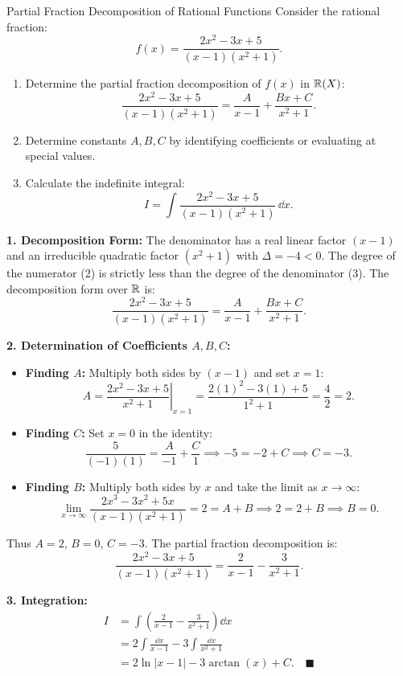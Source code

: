 \begin{exercise}{Partial Fraction Decomposition of Rational Functions}
Consider the rational fraction:
\[
f(x) = \frac{2x^2 - 3x + 5}{(x - 1)(x^2 + 1)}.
\]
\begin{enumerate}[leftmargin=1.5em,itemsep=2pt]
  \item Determine the partial fraction decomposition of $f(x)$ in $\mathbb{R}(X)$:
  \[
  \frac{2x^2 - 3x + 5}{(x - 1)(x^2 + 1)} = \frac{A}{x - 1} + \frac{Bx + C}{x^2 + 1}.
  \]
  \item Determine constants $A, B, C$ by identifying coefficients or evaluating at special values.
  \item Calculate the indefinite integral:
  \[
  I = \int \frac{2x^2 - 3x + 5}{(x - 1)(x^2 + 1)}\,\dd x.
  \]
\end{enumerate}
\end{exercise}

\begin{tabletworkspace}[5.0cm]
\end{tabletworkspace}

\begin{solution}
\textbf{1. Decomposition Form:}
The denominator has a real linear factor $(x - 1)$ and an irreducible quadratic factor $(x^2 + 1)$ with $\Delta = -4 < 0$. The degree of the numerator (2) is strictly less than the degree of the denominator (3).
The decomposition form over $\mathbb{R}$ is:
\[
\frac{2x^2 - 3x + 5}{(x - 1)(x^2 + 1)} = \frac{A}{x - 1} + \frac{Bx + C}{x^2 + 1}.
\]

\textbf{2. Determination of Coefficients $A, B, C$:}
\begin{itemize}[leftmargin=1.5em,itemsep=2pt]
  \item \textbf{Finding $A$:} Multiply both sides by $(x - 1)$ and set $x = 1$:
  \[
  A = \left. \frac{2x^2 - 3x + 5}{x^2 + 1} \right|_{x=1} = \frac{2(1)^2 - 3(1) + 5}{1^2 + 1} = \frac{4}{2} = 2.
  \]
  \item \textbf{Finding $C$:} Set $x = 0$ in the identity:
  \[
  \frac{5}{(-1)(1)} = \frac{A}{-1} + \frac{C}{1} \implies -5 = -2 + C \implies C = -3.
  \]
  \item \textbf{Finding $B$:} Multiply both sides by $x$ and take the limit as $x \to \infty$:
  \[
  \lim_{x \to \infty} \frac{2x^3 - 3x^2 + 5x}{(x - 1)(x^2 + 1)} = 2 = A + B \implies 2 = 2 + B \implies B = 0.
  \]
\end{itemize}
Thus $A = 2$, $B = 0$, $C = -3$.
The partial fraction decomposition is:
\[
\frac{2x^2 - 3x + 5}{(x - 1)(x^2 + 1)} = \frac{2}{x - 1} - \frac{3}{x^2 + 1}.
\]

\textbf{3. Integration:}
\begin{align*}
I &= \int \left( \frac{2}{x - 1} - \frac{3}{x^2 + 1} \right)\dd x \\
&= 2 \int \frac{\dd x}{x - 1} - 3 \int \frac{\dd x}{x^2 + 1} \\
&= 2 \ln|x - 1| - 3 \arctan(x) + C. \quad \blacksquare
\end{align*}
\end{solution}

